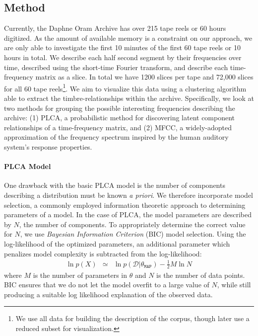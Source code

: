 \documentclass[a4paper,10pt,final]{ThesisStyle}
\begin{document}
\subsection{Method}

Currently, the Daphne Oram Archive has over 215 tape reels or 60 hours digitized.  As the amount of available memory is a constraint on our approach, we are only able to investigate the first 10 minutes of the first 60 tape reels or 10 hours in total.  We describe each half second segment by their frequencies over time, described using the short-time Fourier transform, and describe each time-frequency matrix as a slice.  In total we have 1200 slices per tape and 72,000 slices for all 60 tape reels\footnote{We use all data for building the description of the corpus, though later use a reduced subset for visualization.}.  We aim to visualize this data using a clustering algorithm able to extract the timbre-relationships within the archive.  Specifically, we look at two methods for grouping the possible interesting frequencies describing the archive: (1) PLCA, a probabilistic method for discovering latent component relationships of a time-frequency matrix, and (2) MFCC, a widely-adopted approximation of the frequency spectrum inspired by the human auditory system's response properties.

\paragraph{PLCA Model}
One drawback with the basic PLCA model is the number of components describing a distribution must be known \textit{a priori}.  We therefore incorporate model selection, a commonly employed information theoretic approach to determining parameters of a model.  In the case of PLCA, the model parameters are described by $N$, the number of components.  To appropriately determine the correct value for $N$, we use \textit{Bayesian Information Criterion} (BIC) model selection.  Using the log-likelihood of the optimized parameters, an additional parameter which penalizes model complexity is subtracted from the log-likelihood:
\begin{eqnarray}
\ln{p(X)} &\simeq& \ln{p(\mathcal{D}|\theta_{\mathtt{MAP}})} - \frac{1}{2}M\ln{N}
\end{eqnarray}
where $M$ is the number of parameters in $\theta$ and $N$ is the number of data points.  BIC ensures that we do not let the model overfit to a large value of $N$, while still producing a suitable log likelihood explanation of the observed data.
\end{document}
